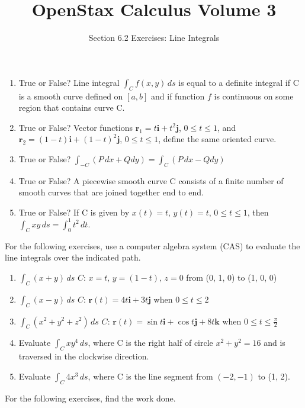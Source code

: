\documentclass{exercises}
\title{OpenStax Calculus Volume 3}
\subtitle{Section 6.2 Exercises: Line Integrals}
\author{}
\date{}
\begin{document}
\maketitle

\begin{enumerate}[start=1]
\item True or False? Line integral $\int_{C}^{}f(x,y)\,ds$ is equal to a definite integral if C is a smooth curve defined on $[a,b]$ and if function $f$ is continuous on some region that contains curve C.
\item True or False? Vector functions $\mathbf{r}_{1}=t\mathbf{i}+t^{2}\mathbf{j}$, $0\le t\le1$, and $\mathbf{r}_{2}=(1-t)\mathbf{i}+{(1-t)}^{2}\mathbf{j}$, $0\le t\le1$, define the same oriented curve.
\item True or False? $\int_{-C}^{}(P\,dx+Qdy)=\int_{C}^{}(P\,dx-Qdy)$
\item True or False? A piecewise smooth curve C consists of a finite number of smooth curves that are joined together end to end.
\item True or False? If C is given by $x(t)=t,\,y(t)=t,\,0\le t\le1$, then $\int_{C}^{}xy\,ds=\int_{0}^{1}t^{2}\,dt$.
\end{enumerate}

For the following exercises, use a computer algebra system (CAS) to evaluate the line integrals over the indicated path.

\begin{enumerate}[resume]
\item \techrequired $\int_{C}^{}(x+y)\,ds$ $C{:}\,x=t,\,y=(1-t),\,z=0$ from (0, 1, 0) to (1, 0, 0)
\item \techrequired $\int_{C}^{}(x-y)\,ds$ $C{:}\,\mathbf{r}(t)=4t\mathbf{i}+3t\mathbf{j}$ when $0\le t\le2$
\item \techrequired $\int_{C}^{}(x^{2}+y^{2}+z^{2})\,ds$ $C{:}\,\mathbf{r}(t)=\sin t\mathbf{i}+\cos t\mathbf{j}+8t\mathbf{k}$ when $0\le t\le \frac{\pi}{2}$
\item \techrequired Evaluate $\int_{C}^{}xy^{4}\,ds$, where C is the right half of circle $x^{2}+y^{2}=16$ and is traversed in the clockwise direction.
\item \techrequired Evaluate $\int_{C}^{}4x^{3}\,ds$, where C is the line segment from $(-2,-1)$ to (1, 2).
\end{enumerate}

For the following exercises, find the work done.
\end{document}
